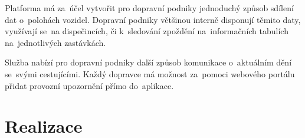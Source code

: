 \setlength{\headheight}{15.04742pt}
Platforma má za~účel vytvořit pro dopravní podniky jednoduchý způsob sdílení dat o~polohách vozidel. Dopravní podniky většinou interně disponují těmito daty, využívají se~na dispečincích, či k~sledování zpoždění na~informačních tabulích na~jednotlivých zastávkách.\par
Služba nabízí pro dopravní podniky další způsob komunikace o~aktuálním dění se~svými cestujícími. Každý dopravce má možnost za~pomoci webového portálu přidat provozní upozornění přímo do~aplikace.

\chapter{Realizace}


